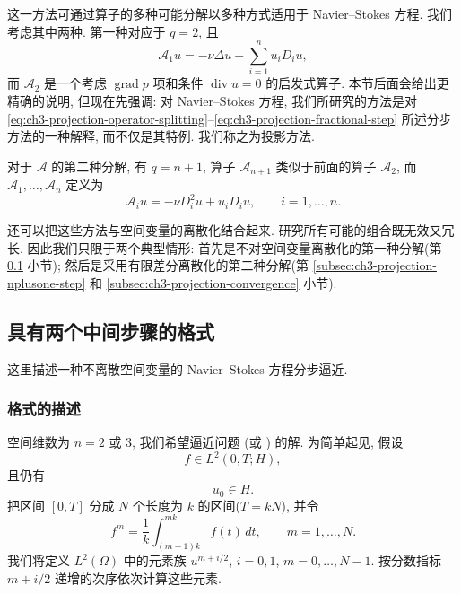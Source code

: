 这一方法可通过算子的多种可能分解以多种方式适用于 Navier--Stokes 方程. 我们考虑其中两种. 第一种对应于 $q=2$, 且
\begin{equation}
\mathcal A_1u=-\nu\Delta u+\sum_{i=1}^n u_iD_i u,
\label{eq:ch3-projection-first-operator}
\end{equation}
而 $\mathcal A_2$ 是一个考虑 $\operatorname{grad}p$ 项和条件 $\operatorname{div}u=0$ 的启发式算子. 本节后面会给出更精确的说明, 但现在先强调: 对 Navier--Stokes 方程, 我们所研究的方法是对 \eqref{eq:ch3-projection-operator-splitting}--\eqref{eq:ch3-projection-fractional-step} 所述分步方法的一种解释, 而不仅是其特例. 我们称之为投影方法.

\hypertarget{chapter-03-page-283}{}
对于 $\mathcal A$ 的第二种分解, 有 $q=n+1$, 算子 $\mathcal A_{n+1}$ 类似于前面的算子 $\mathcal A_2$, 而 $\mathcal A_1,\ldots,\mathcal A_n$ 定义为
\begin{equation}
\mathcal A_i u=-\nu D_i^2u+u_iD_i u,
\qquad i=1,\ldots,n.
\label{eq:ch3-projection-directional-operators}
\end{equation}

还可以把这些方法与空间变量的离散化结合起来. 研究所有可能的组合既无效又冗长. 因此我们只限于两个典型情形: 首先是不对空间变量离散化的第一种分解(第 \ref{subsec:ch3-projection-two-step} 小节); 然后是采用有限差分离散化的第二种分解(第 \ref{subsec:ch3-projection-nplusone-step} 和 \ref{subsec:ch3-projection-convergence} 小节).

\subsection{具有两个中间步骤的格式}
\label{subsec:ch3-projection-two-step}

这里描述一种不离散空间变量的 Navier--Stokes 方程分步逼近.

\subsubsection{格式的描述}
\label{subsubsec:ch3-projection-two-step-description}

空间维数为 $n=2$ 或 $3$, 我们希望逼近问题  (或 ) 的解. 为简单起见, 假设
\begin{equation}
f\in L^2(0,T;H),
\label{eq:ch3-projection-force-assumption}
\end{equation}
且仍有
\begin{equation}
u_0\in H.
\label{eq:ch3-projection-initial-assumption}
\end{equation}
把区间 $[0,T]$ 分成 $N$ 个长度为 $k$ 的区间($T=kN$), 并令
\begin{equation}
f^m=\frac1k\int_{(m-1)k}^{mk}f(t)\,dt,
\qquad m=1,\ldots,N.
\label{eq:ch3-projection-force-average}
\end{equation}
我们将定义 $L^2(\Omega)$ 中的元素族 $u^{m+i/2}$, $i=0,1$, $m=0,\ldots,N-1$. 按分数指标 $m+i/2$ 递增的次序依次计算这些元素.


